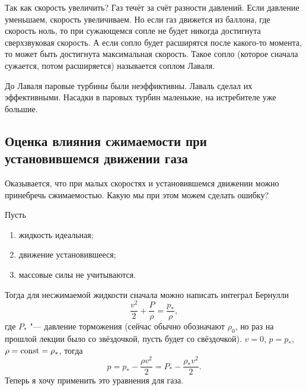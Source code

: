 \begin{roItems}
Так как скорость увеличить? Газ течёт за счёт разности давлений. Если давление уменьшаем, скорость увеличиваем. Но если газ движется из баллона, где скорость ноль, то при сужающемся сопле не будет никогда достигнута сверхзвуковая скорость. А если сопло будет расширятся после какого-то момента, то может быть достигнута максимальная скорость. Такое сопло (которое сначала сужается, потом расширяется) называется соплом Лаваля.
\end{roItems}
До Лаваля паровые турбины были неэффиктивны. Лаваль сделал их эффективными. Насадки в паровых турбин маленькие, на истребителе уже большие.

\subsection{Оценка влияния сжимаемости при установившемся движении газа}
Оказывается, что при малых скоростях и установившемся движении можно принебречь сжимаемостью. Какую мы при этом можем сделать ошибку?

Пусть 
\begin{enumerate}
\item жидкость идеальная;
\item движение установившееся;
\item массовые силы не учитываются.
\end{enumerate}
Тогда для несжимаемой жидкости сначала можно написать интеграл Бернулли
\[
  \frac{v^2}2+\frac{P}\rho = \frac{p_*}\rho,
\]
где $P_*$ "--- давление торможения (сейчас обычно обозначают $\rho_0$, но раз на прошлой лекции было со звёздочкой, пусть будет со свёздочкой). $v=0$, $p=p_*$, $\rho = \operatorname{const}=\rho_*$, тогда 
\[
  p = p_* - \frac{\rho v^2}2=P_*-\frac{\rho_*v^2}2.
\]
Теперь я хочу применить это уравнения для газа.

